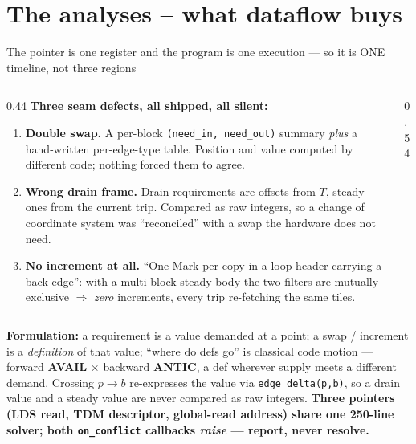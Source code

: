 \documentclass[aspectratio=169,9pt]{beamer}
\newcommand{\key}[1]{\textcolor{acc}{\textbf{#1}}}
\newcommand{\bad}[1]{\textcolor{warn}{\textbf{#1}}}
\newcommand{\good}[1]{\textcolor{ok}{\textbf{#1}}}
\begin{document}
\section{The analyses -- what dataflow buys}
\begin{frame}{The pointer is one register and the program is one execution --- so it is ONE timeline, not three regions}
\begin{columns}[T]
\begin{column}{0.44\textwidth}
\footnotesize
\bad{Three seam defects, all shipped, all silent:}
\begin{enumerate}\itemsep1pt
\item \textbf{Double swap.} A per-block \texttt{(need\_in, need\_out)} summary \emph{plus} a hand-written
  per-edge-type table. Position and value computed by different code; nothing forced them to agree.
\item \textbf{Wrong drain frame.} Drain requirements are offsets from $T$, steady ones from the current
  trip. Compared as raw integers, so a change of coordinate system was ``reconciled'' with a swap the
  hardware does not need.
\item \textbf{No increment at all.} ``One Mark per copy in a loop header carrying a back edge'': with a
  multi-block steady body the two filters are mutually exclusive $\Rightarrow$ \emph{zero} increments,
  every trip re-fetching the same tiles.
\end{enumerate}
\end{column}
\begin{column}{0.54\textwidth}
\centering
{}
\end{column}
\end{columns}
\vspace{1mm}
\footnotesize
\key{Formulation:} a requirement is a value demanded at a point; a swap / increment is a \emph{definition} of
that value; ``where do defs go'' is classical code motion --- forward \textbf{AVAIL} $\times$ backward
\textbf{ANTIC}, a def wherever supply meets a different demand. Crossing $p\!\to\!b$ re-expresses the value via
\texttt{edge\_delta(p,b)}, so a drain value and a steady value are never compared as raw integers.
\good{Three pointers (LDS read, TDM descriptor, global-read address) share one 250-line solver; both
\texttt{on\_conflict} callbacks \emph{raise} --- report, never resolve.}
\end{frame}
\end{document}
